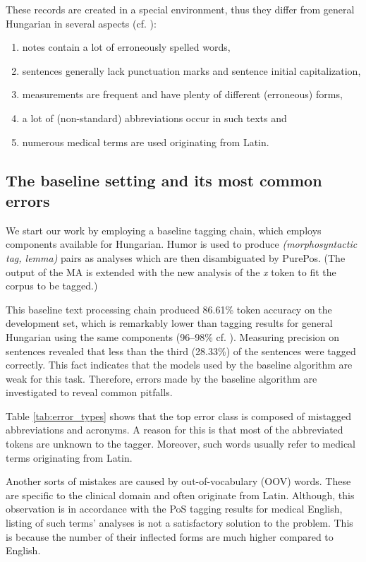 These records are created in a special environment, thus they differ from general Hungarian in several aspects (cf. \cite{Orosz2013a,Siklosi2013b,Siklosi2012}):

\begin{enumerate} %
 \item notes contain a lot of erroneously spelled words,
 \item sentences generally lack punctuation marks and sentence initial capitalization, 
 \item measurements are frequent and have plenty of different (erroneous) forms,
 \item a lot of (non-standard) abbreviations occur in such texts and
 \item numerous medical terms are used originating from Latin.
\end{enumerate}

\subsection{The baseline setting and its most common errors}
\label{sec:baseline}

We start our work by employing a baseline tagging chain, which employs components available for Hungarian. 
Humor is used to produce \emph{(morphosyntactic tag, lemma)} pairs as analyses which are then disambiguated by PurePos. 
(The output of the MA is extended with the new analysis of the \textit{x} token to fit the corpus to be tagged.)

This baseline text processing chain produced 86.61\% token accuracy on the development set, which is remarkably lower than tagging results for general Hungarian using the same components (96--98\% cf. \cite{Orosz2013b,zsibrata2013magyarlanc}). 
Measuring precision on sentences revealed that less than the third (28.33\%) of the sentences were tagged correctly. 
This fact indicates that the models used by the baseline algorithm are weak for this task. 
Therefore, errors made by the baseline algorithm are investigated to reveal common pitfalls. 

Table \ref{tab:error_types} shows that the top error class is composed of mistagged abbreviations and acronyms. 
A reason for this is that most of the abbreviated tokens are unknown to the tagger. 
Moreover, such words usually refer to medical terms originating from Latin.

Another sorts of mistakes are caused by out-of-vocabulary (OOV) words. 
These are specific to the clinical domain and often originate from Latin.
Although, this observation is in accordance with the PoS tagging results for medical English, listing of such terms' analyses is not a satisfactory solution to the problem. 
This is because the number of their inflected forms are much higher compared to English. 

